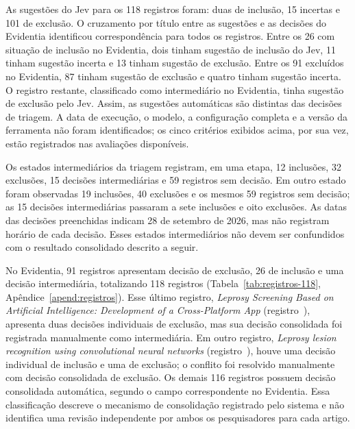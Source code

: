 As sugestões do Jev para os 118 registros foram: duas de inclusão, 15 incertas e 101 de exclusão.
O cruzamento por título entre as sugestões e as decisões do Evidentia
identificou correspondência para todos os registros. Entre os 26 com
situação de inclusão no Evidentia, dois tinham sugestão de inclusão do
Jev, 11 tinham sugestão incerta e 13 tinham sugestão de exclusão. Entre
os 91 excluídos no Evidentia, 87 tinham sugestão de exclusão e quatro
tinham sugestão incerta. O registro restante, classificado como
intermediário no Evidentia, tinha sugestão de exclusão pelo Jev. Assim,
as sugestões automáticas são distintas das decisões de triagem. A data de
execução, o modelo, a configuração completa e a versão da ferramenta não
foram identificados; os cinco critérios exibidos acima, por sua vez, estão
registrados nas avaliações disponíveis.

Os estados intermediários da triagem registram, em uma etapa, 12 inclusões,
32 exclusões, 15 decisões intermediárias e 59 registros sem decisão. Em
outro estado foram observadas 19 inclusões, 40 exclusões e os mesmos 59
registros sem decisão; as 15 decisões intermediárias passaram a sete
inclusões e oito exclusões. As datas das decisões preenchidas indicam
28 de setembro de 2026, mas não registram horário de cada decisão. Esses
estados intermediários não devem ser confundidos com o resultado
consolidado descrito a seguir.

No Evidentia, 91 registros apresentam decisão de exclusão,
26 de inclusão e uma decisão intermediária, totalizando 118 registros (Tabela~\ref{tab:registros-118}, Apêndice~\ref{apend:registros}).
Esse último registro, \textit{Leprosy Screening Based on Artificial
Intelligence: Development of a Cross-Platform App} (registro~), apresenta duas
decisões individuais de exclusão, mas sua decisão consolidada foi
registrada manualmente como intermediária. Em outro registro,
\textit{Leprosy lesion recognition using convolutional neural networks} (registro~),
houve uma decisão individual de inclusão e uma de exclusão; o conflito
foi resolvido manualmente com decisão consolidada de exclusão. Os demais
116 registros possuem decisão consolidada automática, segundo o campo
correspondente no Evidentia. Essa classificação descreve o mecanismo de
consolidação registrado pelo sistema e não identifica uma revisão
independente por ambos os pesquisadores para cada artigo.

